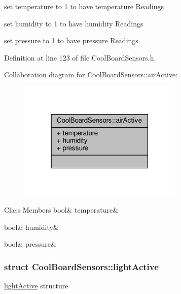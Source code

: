 set temperature to 1 to have temperature Readings

set humidity to 1 to have humidity Readings

set pressure to 1 to have pressure Readings 

Definition at line 123 of file Cool\+Board\+Sensors.\+h.



Collaboration diagram for Cool\+Board\+Sensors\+:\+:air\+Active\+:
\nopagebreak
\begin{figure}[H]
\begin{center}
\leavevmode
\includegraphics[width=223pt]{d5/d30/struct_cool_board_sensors_1_1air_active__coll__graph}
\end{center}
\end{figure}
\begin{DoxyFields}{Class Members}
\mbox{\label{class_cool_board_sensors_ac08576736c7ac3bfbfec32e5ee17c686}} 
bool&
temperature&
\\
\hline

\mbox{\label{class_cool_board_sensors_ab69738e9fd1c2ba80dc666bcd1e116f7}} 
bool&
humidity&
\\
\hline

\mbox{\label{class_cool_board_sensors_a15932ccfb6ee6603713d937ec9b76b72}} 
bool&
pressure&
\\
\hline

\end{DoxyFields}
\label{struct_cool_board_sensors_1_1light_active}
\subsubsection{struct Cool\+Board\+Sensors\+:\+:light\+Active}
\hyperlink{class_cool_board_sensors_df/da3/struct_cool_board_sensors_1_1light_active}{light\+Active} structure

